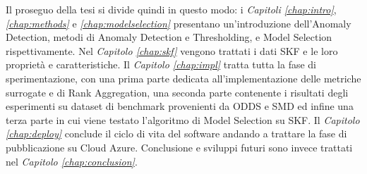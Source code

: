 Il proseguo della tesi si divide quindi in questo modo: i \textit{Capitoli \ref{chap:intro}}, \textit{\ref{chap:methods}} e \textit{\ref{chap:modelselection}} presentano un'introduzione dell'Anomaly Detection, metodi di Anomaly Detection e Thresholding, e Model Selection rispettivamente. Nel \textit{Capitolo \ref{chap:skf}} vengono trattati i dati SKF e le loro proprietà e caratteristiche. Il \textit{Capitolo \ref{chap:impl}} tratta tutta la fase di sperimentazione, con una prima parte dedicata all'implementazione delle metriche surrogate e di Rank Aggregation, una seconda parte contenente i risultati degli esperimenti su dataset di benchmark provenienti da ODDS e SMD ed infine una terza parte in cui viene testato l'algoritmo di Model Selection su SKF. Il \textit{Capitolo \ref{chap:deploy}} conclude il ciclo di vita del software andando a trattare la fase di pubblicazione su Cloud Azure.
Conclusione e sviluppi futuri sono invece trattati nel \textit{Capitolo \ref{chap:conclusion}}.